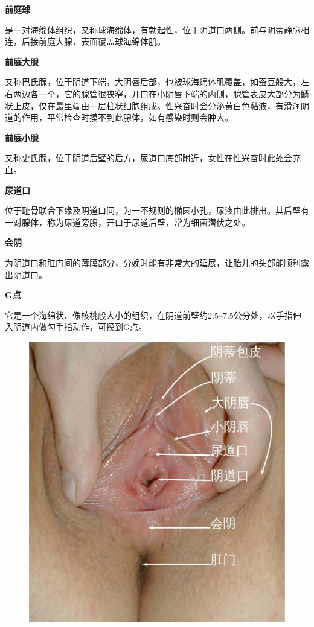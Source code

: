 \documentclass[12pt,UTF8]{ctexbook}
\begin{document}
\textbf{前庭球}

是一对海绵体组织，又称球海绵体，有勃起性，位于阴道口两侧。前与阴蒂静脉相连，后接前庭大腺，表面覆盖球海绵体肌。

\textbf{前庭大腺}

又称巴氏腺，位于阴道下端，大阴唇后部，也被球海绵体肌覆盖，如蚕豆般大，左右两边各一个，它的腺管很狭窄，开口在小阴唇下端的内侧，腺管表皮大部分为鳞状上皮，仅在最里端由一层柱状细胞组成。性兴奋时会分泌黃白色黏液，有滑润阴道的作用，平常检查时摸不到此腺体，如有感染时则会肿大。

\textbf{前庭小腺}

又称史氏腺，位于阴道后壁的后方，尿道口底部附近，女性在性兴奋时此处会充血。

\textbf{尿道口}

位于耻骨联合下缘及阴道口间，为一不规则的椭圆小孔，尿液由此排出。其后壁有一对腺体，称为尿道旁腺，开口于尿道后壁，常为细菌潜伏之处。

\textbf{会阴}

为阴道口和肛门间的薄膜部分，分娩时能有非常大的延展，让胎儿的头部能顺利露出阴道口。

\textbf{G点}

它是一个海绵状、像核桃般大小的组织，在阴道前壁约2.5--7.5公分处，以手指伸入阴道内做勾手指动作，可摸到G点。

\begin{figure}[htbp]
	\centering
	\includegraphics[width=0.7\linewidth]{1}
	\caption{}
	\label{fig:1}
\end{figure}
\end{document}
